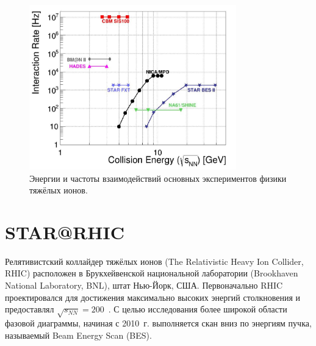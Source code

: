 \begin{figure}[H]
\includegraphics[width=0.8\textwidth]{pictures/Experiments.png}
\caption{Энергии и частоты взаимодействий основных экспериментов физики тяжёлых ионов.}
\label{fig:Experiments}
\end{figure}



\section{STAR@RHIC}


Релятивистский коллайдер тяжёлых ионов (The Relativistic Heavy Ion Collider, RHIC) расположен в Брукхейвенской национальной лаборатории (Brookhaven National Laboratory, BNL), штат Нью-Йорк, США. Первоначально RHIC проектировался для достижения максимально высоких энергий столкновения и предоставлял $\sqrt{s_{NN}}=200$~\GeVperNucl. С целью исследования более широкой области фазовой диаграммы, начиная с 2010~г. выполняется скан вниз по энергиям пучка, называемый Beam Energy Scan (BES).

